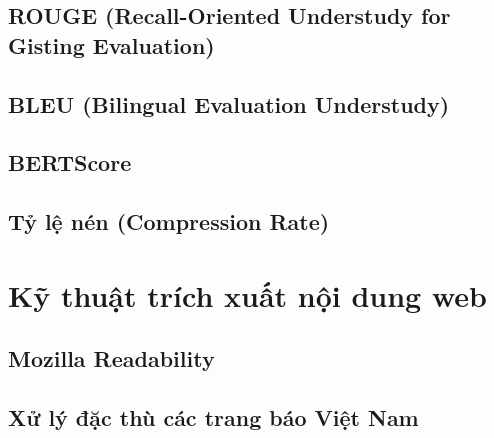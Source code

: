 \subsection{ROUGE (Recall-Oriented Understudy for Gisting Evaluation)}

\subsection{BLEU (Bilingual Evaluation Understudy)}

\subsection{BERTScore}

\subsection{Tỷ lệ nén (Compression Rate)}

\section{Kỹ thuật trích xuất nội dung web}

\subsection{Mozilla Readability}

\subsection{Xử lý đặc thù các trang báo Việt Nam}

